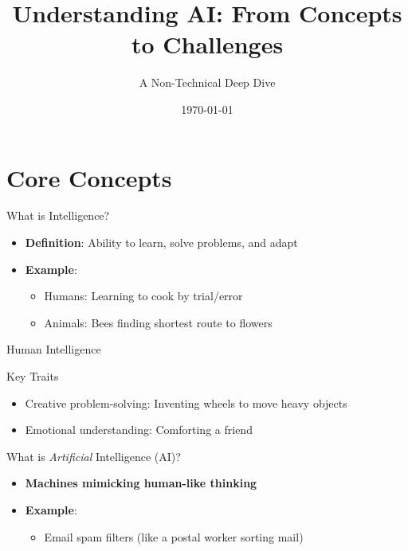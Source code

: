 \documentclass{beamer}
\title{Understanding AI: From Concepts to Challenges}
\subtitle{A Non-Technical Deep Dive}
\author{}
\institute{}
\date{\today}
\begin{document}
\begin{frame}
\titlepage
\end{frame}

\section{Core Concepts}
\begin{frame}{What is Intelligence?}
\begin{itemize}
\item \textbf{Definition}: Ability to learn, solve problems, and adapt
\item \textbf{Example}: 
\begin{itemize}
\item Humans: Learning to cook by trial/error
\item Animals: Bees finding shortest route to flowers
\end{itemize}
\end{itemize}
\end{frame}

\begin{frame}{Human Intelligence}
\begin{exampleblock}{Key Traits}
\begin{itemize}
\item Creative problem-solving: Inventing wheels to move heavy objects
\item Emotional understanding: Comforting a friend
\end{itemize}
\end{exampleblock}
\end{frame}

\begin{frame}{What is \textit{Artificial} Intelligence (AI)?}
\begin{itemize}
\item \textbf{Machines mimicking human-like thinking}
\item \textbf{Example}: 
\begin{itemize}
\item Email spam filters (like a postal worker sorting mail)
\end{itemize}
\end{itemize}
\end{frame}


\end{document}
